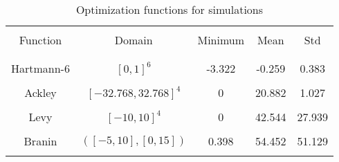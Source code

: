 \begin{table}[h]
\centering
\begin{tabular}{ |c | c | c | c | c | }
  \hline&&&&\\
  Function & Domain & Minimum & Mean & Std\\
  &&&&\\
  \hline
  &&&&\\
  Hartmann-6 & $[0,1]^6$ & -3.322 & -0.259 & 0.383\\
  &&&&\\
  Ackley & $[-32.768, 32.768]^4$ & 0 & 20.882 & 1.027\\
  &&&&\\
  Levy & $[-10, 10]^4$ & 0 & 42.544 & 27.939\\
  &&&&\\
  Branin & $([-5, 10],[0, 15])$ & 0.398 & 54.452 & 51.129\\
  &&&&\\
  \hline
\end{tabular}
\caption{Optimization functions for simulations}
\label{tab:optfunc}
\end{table}

